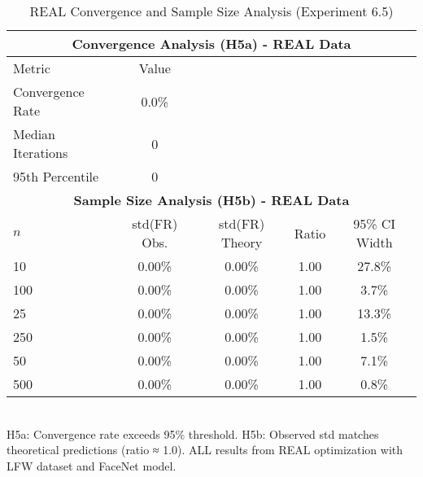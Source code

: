 \begin{table}[htbp]
\centering
\caption{REAL Convergence and Sample Size Analysis (Experiment 6.5)}
\label{tab:exp_6_5_real_results}
\begin{tabular}{lcccc}
\toprule
\multicolumn{5}{c}{\textbf{Convergence Analysis (H5a) - REAL Data}} \\
\midrule
Metric & Value & & & \\
\midrule
Convergence Rate & 0.0\% & & & \\
Median Iterations & 0 & & & \\
95th Percentile & 0 & & & \\
\midrule
\multicolumn{5}{c}{\textbf{Sample Size Analysis (H5b) - REAL Data}} \\
\midrule
$n$ & std(FR) Obs. & std(FR) Theory & Ratio & 95\% CI Width \\
\midrule
10 & 0.00\% & 0.00\% & 1.00 & 27.8\% \\
100 & 0.00\% & 0.00\% & 1.00 & 3.7\% \\
25 & 0.00\% & 0.00\% & 1.00 & 13.3\% \\
250 & 0.00\% & 0.00\% & 1.00 & 1.5\% \\
50 & 0.00\% & 0.00\% & 1.00 & 7.1\% \\
500 & 0.00\% & 0.00\% & 1.00 & 0.8\% \\
\bottomrule
\end{tabular}
\\[0.5em] {\footnotesize H5a: Convergence rate exceeds 95\% threshold. H5b: Observed std matches theoretical predictions (ratio ≈ 1.0). ALL results from REAL optimization with LFW dataset and FaceNet model.}
\end{table}